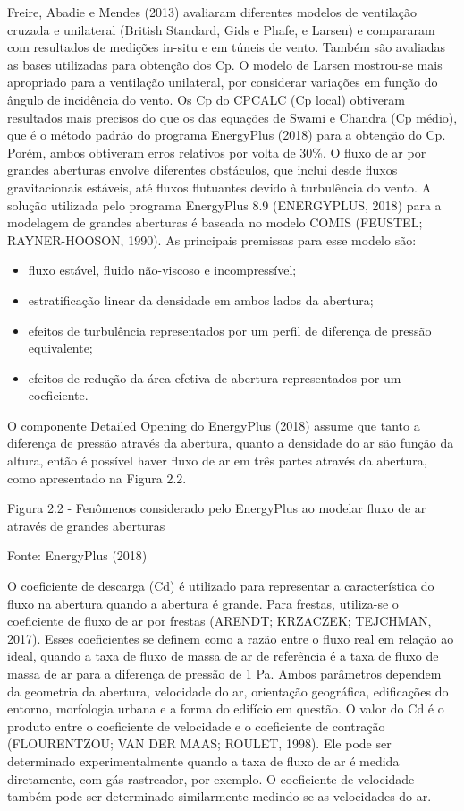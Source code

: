 \documentclass[brazil,hardcopy,openany,a5paper]{ufscthesis}
\begin{document}
	Freire, Abadie e Mendes (2013) avaliaram diferentes modelos de ventilação cruzada e unilateral (British Standard, Gids e Phafe, e Larsen) e compararam com resultados de medições in-situ e em túneis de vento. Também são avaliadas as bases utilizadas para obtenção dos Cp. O modelo de Larsen mostrou-se mais apropriado para a ventilação unilateral, por considerar variações em função do ângulo de incidência do vento. Os Cp do CPCALC (Cp local) obtiveram resultados mais precisos do que os das equações de Swami e Chandra (Cp médio), que é o método padrão do programa EnergyPlus (2018) para a obtenção do Cp. Porém, ambos obtiveram erros relativos por volta de 30\%. O fluxo de ar por grandes aberturas envolve diferentes obstáculos, que inclui desde fluxos gravitacionais estáveis, até fluxos flutuantes devido à turbulência do vento. A solução utilizada pelo programa EnergyPlus 8.9 (ENERGYPLUS, 2018) para a modelagem de grandes aberturas é baseada no modelo COMIS (FEUSTEL; RAYNER-HOOSON, 1990). As principais premissas para esse modelo são:
	
	\begin{itemize}
		\item fluxo estável, fluido não-viscoso e incompressível;
		\item estratificação linear da densidade em ambos lados da abertura;
		\item efeitos de turbulência representados por um perfil de diferença de pressão equivalente;
		\item efeitos de redução da área efetiva de abertura representados por um	coeficiente.
	\end{itemize}
	
	O componente Detailed Opening do EnergyPlus (2018) assume que tanto a diferença de pressão através da abertura, quanto a densidade do ar são função da altura, então é possível haver fluxo de ar em três partes através da abertura, como apresentado na Figura 2.2.
	
	Figura 2.2 - Fenômenos considerado pelo EnergyPlus ao modelar fluxo de ar através de grandes aberturas
	
	Fonte: EnergyPlus (2018)
	
	O coeficiente de descarga (Cd) é utilizado para representar a característica do fluxo na abertura quando a abertura é grande. Para frestas, utiliza-se o coeficiente de fluxo de ar por frestas (ARENDT; KRZACZEK; TEJCHMAN, 2017).
	Esses coeficientes se definem como a razão entre o fluxo real em relação ao	ideal, quando a taxa de fluxo de massa de ar de referência é a taxa de fluxo de massa de ar para a diferença de pressão de 1 Pa. Ambos parâmetros dependem da geometria da abertura, velocidade do ar, orientação geográfica, edificações do entorno, morfologia urbana e a forma do edifício em questão.
	O valor do Cd é o produto entre o coeficiente de velocidade e o coeficiente de contração (FLOURENTZOU; VAN DER MAAS; ROULET, 1998). Ele pode ser determinado experimentalmente quando a taxa de fluxo de ar é medida diretamente, com gás rastreador, por exemplo. O coeficiente de velocidade também pode ser determinado similarmente medindo-se as velocidades do ar.
	
\end{document}
